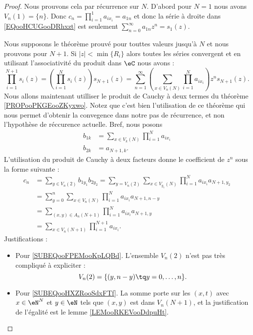 \begin{proof}
	Nous prouvons cela par récurrence sur \( N\). D'abord pour \( N=1\) nous avons \( V_n(1)=\{ n \}\). Donc \( c_n=\prod_{i=1}^1a_{ix_i}=a_{1n}\) et donc la série à droite dans \eqref{EQooHCUGooDRhxzt} est seulement \( \sum_{n=0}^{\infty}a_{1n}z^n=s_1(z)\).

	Nous supposons le théorème prouvé pour touttes valeurs jusqu'à \( N\) et nous prouvons pour \( N+1\). Si \( | z |<\min\{ R_i \}\) alors toutes les séries convergent et en utilisant l'associativité du produit dans \( \eC\) nous avons :
	\begin{equation}
		\prod_{i=1}^{N+1}s_i(z)=\left( \prod_{i=1}^Ns_i(z) \right)s_{N+1}(z)=\sum_{n=1}^{\infty}\left( \sum_{x\in V_n(N)}\prod_{i=1}^Na_{ix_i} \right)z^ns_{N+1}(z).
	\end{equation}
	Nous allons maintenant utilliser le produit de Cauchy à deux termes du théorème \ref{PROPooPKGEooZKyxwo}. Notez que c'est bien l'utilisation de ce théorème qui nous permet d'obtenir la convegence dans notre pas de récurrence, et non l'hypothèse de réccurence actuelle. Bref, nous posons
	\begin{subequations}
		\begin{align}
			b_{1k} & =\sum_{x\in V_k(N)}\prod_{i=1}^Na_{ix_i} \\
			b_{2k} & =a_{N+1,k}.
		\end{align}
	\end{subequations}
	L'utilisation du produit de Cauchy à deux facteurs donne le coefficient de \( z^n\) sous la forme suivante :
	\begin{subequations}
		\begin{align}
			c_n & =\sum_{y\in V_n(2)}b_{1y_1}b_{2y_2}=\sum_{y=V_n(2)}\sum_{x\in V_{y_1}(N)}\prod_{i=1}^Na_{ix_i}a_{N+1,y_2} \\
			    & =\sum_{y=0}^n\sum_{x\in V_n(N)}\prod_{i=1}^Na_{ix_i}a_{N+1,n-y}        \label{SUBEQooFPEMooKpLQBd}        \\
			    & =\sum_{(x,y)\in A_n(N+1)}\prod_{i=1}^Na_{ix_i}a_{N+1, y}       \label{SUBEQooHXZRooSdxFTf}                \\
			    & =\sum_{x\in V_n(N+1)}\prod_{i=1}^{N+1}a_{ix_i}.
		\end{align}
	\end{subequations}
	Justifications :
	\begin{itemize}
		\item Pour \eqref{SUBEQooFPEMooKpLQBd}. L'ensemble \( V_n(2)\) n'est pas très compliqué à expliciter :
		      \begin{equation}
			      V_n(2)=\{ (y,n-y)\tq y=0,\ldots, n \}.
		      \end{equation}
		\item   Pour \eqref{SUBEQooHXZRooSdxFTf}. La somme porte sur les \( (x,t)\) avec \(x\in \eN^N\) et \( y\in \eN\) tels que \( (x,y) \) est dans \( V_n(N+1)\), et la justification de l'égalité est le lemme \ref{LEMooRKEVooDdpuHt}.
	\end{itemize}
\end{proof}

